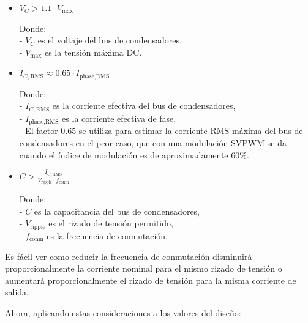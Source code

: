 \begin{itemize}
	\item \( V_C > 1.1 \cdot V_{\text{max}} \)
	
	Donde:\\
	- \( V_C \) es el voltaje del bus de condensadores,\\
	- \( V_{\text{max}} \) es la tensión máxima DC.\\
	
	\item \( I_{C,\text{RMS}} \approx 0.65 \cdot I_{\text{phase,RMS}} \)
	
	Donde:\\
	- \( I_{C,\text{RMS}} \) es la corriente efectiva del bus de condensadores,\\
	- \( I_{\text{phase,RMS}} \) es la corriente efectiva de fase,\\
	- El factor 0.65 se utiliza para estimar la corriente RMS máxima del bus de condensadores en el peor caso, que con una modulación SVPWM se da cuando el índice de modulación es de aproximadamente 60\%.\\
	
	\item \( C > \frac{I_{C,\text{RMS}}}{V_{\text{ripple}} \cdot f_{\text{conm}}} \)
	
	Donde:\\
	- \( C \) es la capacitancia del bus de condensadores,\\
	- \( V_{\text{ripple}} \) es el rizado de tensión permitido,\\
	- \( f_{\text{conm}} \) es la frecuencia de conmutación.\\
\end{itemize}

Es fácil ver como reducir la frecuencia de conmutación disminuirá proporcionalmente la corriente nominal para el mismo rizado de tensión o aumentará proporcionalmente el rizado de tensión para la misma corriente de salida.

Ahora, aplicando estas consideraciones a los valores del diseño:

